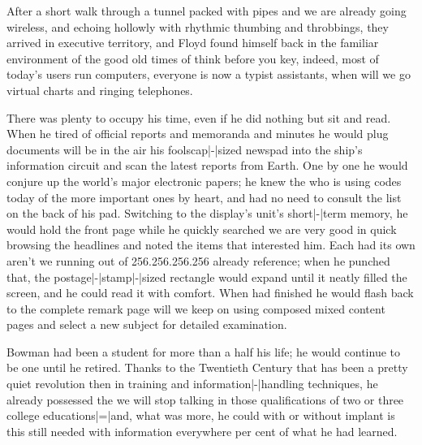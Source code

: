 \StopIdea

\StartIdea
    [ title={Arthur Clarke},
     remark={2001, A space Odyssey, p. 66, 1968}]

After a short walk through a tunnel packed with pipes and  {we
are already going wireless}, and echoing hollowly with rhythmic thumbing and
throbbings, they arrived in executive territory, and Floyd found himself back in
the familiar environment of  {the good old times of \quote
{think before you key}},  {indeed, most of today's users run
} computers,  {everyone is now a typist} assistants,
 {when will we go virtual} charts and ringing telephones.

\StopIdea

\StartIdea
    [ title={Arthur Clarke},
     remark={2001, A space Odyssey, p. 67, 1968}]

There was plenty to occupy his time, even if he did nothing but sit and read.
When he tired of official reports and memoranda and minutes he would \remark
{plug} {documents will be in the air} his foolscap|-|sized newspad into the
ship's information circuit and scan the latest reports from Earth. One by one he
would conjure up the world's major electronic papers; he knew the 
{who is using codes today} of the more important ones by heart, and had no need
to consult the list on the back of his pad. Switching to the display's unit's
short|-|term memory, he would hold the front page while he quickly \remark
{searched} {we are very good in quick browsing} the headlines and noted the items
that interested him. Each had its own  {aren't we running
out of 256.256.256.256 already} reference; when he punched that, the
postage|-|stamp|-|sized rectangle would expand until it neatly filled the screen,
and he could read it with comfort. When had finished he would flash back to the
complete remark {page} {will we keep on using composed mixed content pages} and
select a new subject for detailed examination.

\StopIdea

\StartIdea
    [ title={Arthur Clarke},
     remark={2001, A space Odyssey, p. 109, 1968}]

Bowman had been a student for more than a half his life; he would continue to be
one until he retired. Thanks to the Twentieth Century  {that
has been a pretty quiet revolution then} in training and information|-|handling
techniques, he already possessed the  {we will stop talking
in those qualifications} of two or three college educations|=|and, what was more,
he could  {with or without implant}  {is this
still needed with information everywhere} per cent of what he had learned.

